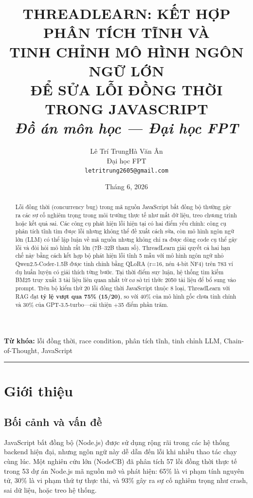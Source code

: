 \documentclass[12pt]{article}
\title{%
  \large\textbf{THREADLEARN: KẾT HỢP PHÂN TÍCH TĨNH VÀ}\\[2pt]
  \large\textbf{TINH CHỈNH MÔ HÌNH NGÔN NGỮ LỚN}\\[2pt]
  \large\textbf{ĐỂ SỬA LỖI ĐỒNG THỜI TRONG JAVASCRIPT}\\[8pt]
  \normalsize\textit{Đồ án môn học --- Đại học FPT}
}
\author{%
  Lê Trí Trung\quad Hà Văn Ân\\[2pt]
  \small Đại học FPT\\
  \small\texttt{letritrung2605@gmail.com}
}
\date{Tháng 6, 2026}
\begin{document}
\maketitle
\thispagestyle{fancy}

\begin{abstract}
\noindent
Lỗi đồng thời (concurrency bug) trong mã nguồn JavaScript bất đồng bộ thường gây
ra các sự cố nghiêm trọng trong môi trường thực tế như mất dữ liệu, treo chương
trình hoặc kết quả sai.
Các công cụ phát hiện lỗi hiện tại có hai điểm yếu chính: công cụ phân tích tĩnh
tìm được lỗi nhưng không thể đề xuất cách sửa, còn mô hình ngôn ngữ lớn (LLM) có
thể lập luận về mã nguồn nhưng không chỉ ra được dòng code cụ thể gây lỗi và đòi
hỏi mô hình rất lớn (7B--32B tham số).
ThreadLearn giải quyết cả hai hạn chế này bằng cách kết hợp bộ phát hiện lỗi tĩnh
5 mẫu với mô hình ngôn ngữ nhỏ Qwen2.5-Coder-1.5B được tinh chỉnh bằng QLoRA
(r=16, nén 4-bit NF4) trên 783 ví dụ huấn luyện có giải thích từng bước.
Tại thời điểm suy luận, hệ thống tìm kiếm BM25 truy xuất 3 tài liệu liên quan nhất
từ cơ sở tri thức 2050 tài liệu để bổ sung vào prompt.
Trên bộ kiểm thử 20 lỗi đồng thời JavaScript thuộc 8 loại,
ThreadLearn với RAG đạt \textbf{tỷ lệ vượt qua 75\% (15/20)}, so với 40\% của mô hình
gốc chưa tinh chỉnh và 30\% của GPT-3.5-turbo---cải thiện $+$35 điểm phần trăm.
\end{abstract}

\noindent\textbf{Từ khóa:} lỗi đồng thời, race condition, phân tích tĩnh,
tinh chỉnh LLM, Chain-of-Thought, JavaScript

\bigskip\hrule\bigskip

\section{Giới thiệu}
\label{sec:gioithieu}

\subsection{Bối cảnh và vấn đề}

JavaScript bất đồng bộ (Node.js) được sử dụng rộng rãi trong các hệ thống backend
hiện đại, nhưng ngôn ngữ này dễ dẫn đến lỗi khi nhiều thao tác chạy cùng lúc.
Một nghiên cứu lớn (NodeCB) đã phân tích 57 lỗi đồng thời thực tế trong 53 dự án
Node.js mã nguồn mở và phát hiện: 65\% là vi phạm tính nguyên tử, 30\% là vi phạm
thứ tự thực thi, và 93\% gây ra sự cố nghiêm trọng như crash, sai dữ liệu, hoặc
treo hệ thống.
\end{document}
